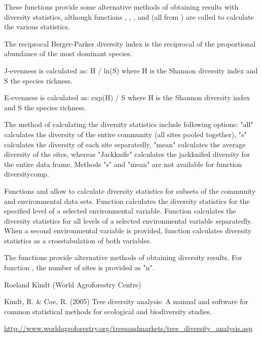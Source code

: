 \begin{Details}\relax
These functions provide some alternative methods of obtaining results with diversity statistics, although functions , , ,  and  (all from ) are called to calculate the various statistics.

The reciprocal Berger-Parker diversity index is the reciprocal of the proportional abundance of the most dominant species.

J-evenness is calculated as: H / ln(S) where H is the Shannon diversity index and S the species richness.

E-evenness is calculated as: exp(H) / S where H is the Shannon diversity index and S the species richness.

The method of calculating the diversity statistics include following options: "all" calculates the diversity of the entire community (all sites pooled together), "s" calculates the diversity of each site separatedly, "mean" calculates the average diversity of the sites, whereas "Jackknife" calculates the jackknifed diversity for the entire data frame. Methods "s" and "mean" are not available for function diversitycomp.

Functions  and  allow to calculate diversity statistics for subsets of the community and environmental data sets. Function  calculates the diversity statistics for the specified level of a selected environmental variable. Function  calculates the diversity statistics for all  levels of a selected environmental variable separatedly. When a second environmental variable is provided, function  calculates diversity statistics as a crosstabulation of both variables.
\end{Details}
\begin{Value}
The functions provide alternative methods of obtaining diversity results. For function , the number of sites is provided as "n".
\end{Value}
\begin{Author}\relax
Roeland Kindt (World Agroforestry Centre)
\end{Author}
\begin{References}\relax
Kindt, R. \& Coe, R. (2005)
Tree diversity analysis: A manual and
software for common statistical methods for ecological and
biodiversity studies.

\url{http://www.worldagroforestry.org/treesandmarkets/tree_diversity_analysis.asp}
\end{References}
